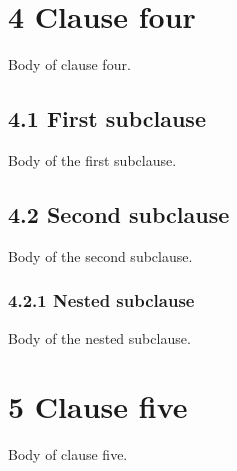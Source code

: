 \documentclass{article}
\begin{document}
\section{4 Clause four}

Body of clause four.

\subsection{4.1 First subclause}

Body of the first subclause.

\subsection{4.2 Second subclause}

Body of the second subclause.

\subsubsection{4.2.1 Nested subclause}

Body of the nested subclause.

\section{5 Clause five}

Body of clause five.
\end{document}
